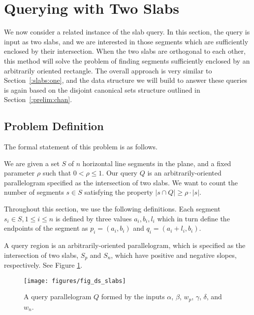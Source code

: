 \section{Querying with Two Slabs}
\label{:slabs:two}

We now consider a related instance of the slab query. In this section, the query is input as two slabs, and we are interested in those segments which are sufficiently enclosed by their intersection. When the two slabs are orthogonal to each other, this method will solve the problem of finding segments sufficiently enclosed by an arbitrarily oriented rectangle.  The overall approach is very similar to Section~\ref{:slabs:one}, and the data structure we will build to answer these queries is again based on the disjoint canonical sets structure outlined in Section~\ref{:prelim:chan}.


\subsection{Problem Definition}
\label{:slabs:two:problem}

The formal statement of this problem is as follows.

\begin{problem}
We are given a set $S$ of $n$ horizontal line segments in the plane, and a fixed parameter $\rho$ such that $0 < \rho \leq 1$. Our query $Q$ is an arbitrarily-oriented parallelogram specified as the intersection of two slabs. We want to count the number of segments $s \in S$  satisfying the property $|s \cap Q| \geq \rho \cdot |s|$.
\end{problem}

Throughout this section, we use the following definitions. Each segment $s_i \in S, 1 \leq i \leq n$ is defined by three values $a_i, b_i, l_i$ which in turn define the endpoints of the segment as $p_i = (a_i, b_i)$ and $q_i = (a_i + l_i, b_i)$.

A query region is an arbitrarily-oriented parallelogram, which is specified as the intersection of two slabs, $S_p$ and $S_n$, which have positive and negative slopes, respectively. See Figure \ref{fig:slabs:two:ds}.

\begin{figure}[t]
\begin{center}
  \texttt{[image: figures/fig\_ds\_slabs]}
  \caption{A query parallelogram $Q$ formed by the inputs $\alpha$, $\beta$, $w_p$,
  $\gamma$, $\delta$, and $w_n$.}
  \label{fig:slabs:two:ds}
\end{center}
\end{figure}

